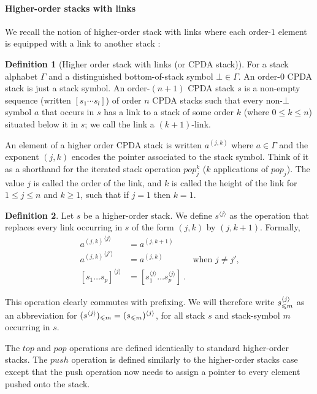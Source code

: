 \documentclass[a4paper,draft]{article}[12pt]
\theoremstyle{remark}
\theoremstyle{definition}
\newtheorem{definition}{Definition}[section]
\begin{document}
\paragraph{Higher-order stacks with links}

We recall the notion of higher-order stack with links where each order-$1$ element is equipped with a link to another stack \cite{hague-collaps-full}:

\begin{definition}[Higher order stack with links (or CPDA stack)]
For a stack alphabet $\Gamma$ and a distinguished bottom-of-stack symbol $\bot\in \Gamma$. An order-$0$ CPDA stack is just a stack symbol. An order-$(n+1)$ CPDA stack $s$ is a non-empty sequence (written $[s_1 \cdots s_l]$) of order $n$ CPDA stacks such that every non-$\bot$ symbol $a$ that occurs in $s$ has a link to a stack of some order $k$ (where $0 \leq k \leq n$) situated below it in $s$; we call the link a $(k + 1)$-link.
\end{definition}

An element of a higher order CPDA stack is written $a^{(j,k)}$ where $a\in \Gamma$ and the exponent $(j,k)$ encodes the pointer associated to the stack symbol. Think of it as a shorthand for the iterated stack operation $pop_j^k$ ($k$ applications of $pop_j$).
The value $j$ is called the order of the link, and $k$ is called the height of the link for $1 \leq j \leq n$ and $k \geq 1$, such that if $j = 1$ then $k = 1$.

\begin{definition}
Let $s$ be a higher-order stack. We define $s^{\langle j \rangle}$ as the operation that replaces
every link occurring in $s$ of the form $(j,k)$ by $(j,k+1)$. Formally,
\begin{align*}
{a^{(j,k)}}^{\langle j \rangle} &= a^{(j,k+1)}   \\
{a^{(j,k)}}^{\langle j' \rangle} &= a^{(j,k)} &   \mbox{when $j\neq j'$,}\\
[s_1 \ldots s_p]^{\langle j \rangle} &= [s_1^{\langle j \rangle} \ldots s_p^{\langle j \rangle}] \ .
\end{align*}
\end{definition}
This operation clearly commutes with prefixing. We will therefore write $s^{\langle j\rangle}_{\leqslant m}$ as an abbreviation for
$(s^{\langle j\rangle})_{\leqslant m} = (s_{\leqslant m})^{\langle j\rangle}$,
for all stack $s$ and stack-symbol $m$ occurring in $s$.


The $top$ and $pop$ operations are defined identically to standard higher-order stacks.
The $push$ operation is defined similarly to the higher-order stacks case except that the push operation now needs to assign a pointer to every element pushed onto the stack. 
\end{document}
